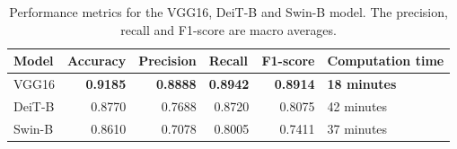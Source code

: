 \documentclass[11pt, a4paper]{article}
\begin{document}
\begin{table}[b]
    \begin{tabular}{@{}lrrrrl@{}}
        \toprule
        \textbf{Model} & \multicolumn{1}{l}{\textbf{Accuracy}} & \multicolumn{1}{l}{\textbf{Precision}} & \multicolumn{1}{l}{\textbf{Recall}} & \multicolumn{1}{l}{\textbf{F1-score}} & \textbf{Computation time} \\ \midrule
        VGG16          & \textbf{0.9185}                       & \textbf{0.8888}                        & \textbf{0.8942}                     & \textbf{0.8914}                       & \textbf{18 minutes}       \\
        DeiT-B         & 0.8770                                & 0.7688                                 & 0.8720                              & 0.8075                                & 42 minutes                \\
        Swin-B         & 0.8610                                & 0.7078                                 & 0.8005                              & 0.7411                                & 37 minutes                \\ \bottomrule

    \end{tabular}
    \caption{Performance metrics for the VGG16, DeiT-B and Swin-B model. The precision, recall and F1-score are macro averages.}
    \label{tab:poverall}
\end{table}
\end{document}
